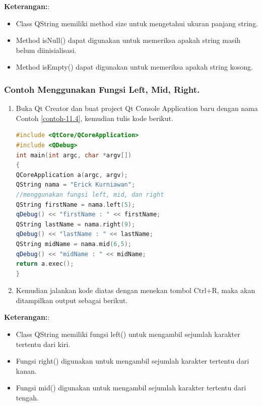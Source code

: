 \textbf{Keterangan:}:

\begin{itemize}

\item
  Class QString memiliki method size untuk mengetahui ukuran panjang
  string.
\item
  Method isNull() dapat digunakan untuk memeriksa apakah string masih
  belum diinisialisasi.
\item
  Method isEmpty() dapat digunakan untuk memeriksa apakah string kosong.
\end{itemize}

\subsubsection*{Contoh  Menggunakan Fungsi Left, Mid, Right.}

\begin{enumerate}

\item
  Buka Qt Creator dan buat project Qt Console Application baru dengan
  nama Contoh \ref{contoh-11.4}, kemudian tulis kode berikut.

\begin{lstlisting}[language=c++,caption= Menggunakan Fungsi Left Mid Right, label=contoh-11.4]
#include <QtCore/QCoreApplication>
#include <QDebug>
int main(int argc, char *argv[])
{
QCoreApplication a(argc, argv);
QString nama = "Erick Kurniawan";
//menggunakan fungsi left, mid, dan right
QString firstName = nama.left(5);
qDebug() << "firstName : " << firstName;
QString lastName = nama.right(9);
qDebug() << "lastName : " << lastName;
QString midName = nama.mid(6,5);
qDebug() << "midName : " << midName;
return a.exec();
}
\end{lstlisting}
\item
  Kemudian jalankan kode diatas dengan menekan tombol Ctrl+R, maka akan
  ditampilkan output sebagai berikut.
\end{enumerate}

\textbf{Keterangan:}:

\begin{itemize}

\item
  Class QString memiliki fungsi left() untuk mengambil sejumlah karakter
  tertentu dari kiri.
\item
  Fungsi right() digunakan untuk mengambil sejumlah karakter tertentu
  dari kanan.
\item
  Fungsi mid() digunakan untuk mengambil sejumlah karakter tertentu dari
  tengah.
\end{itemize}

